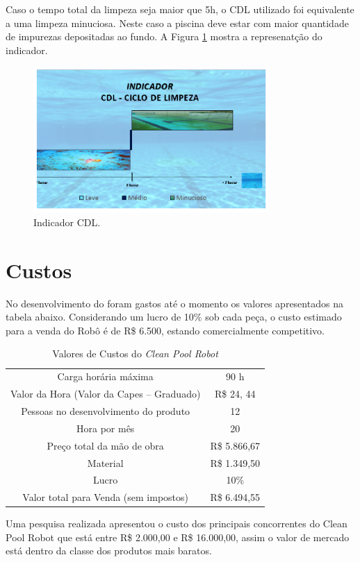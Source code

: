 Caso o tempo total da limpeza seja maior que 5h, o \textsf{CDL} utilizado foi equivalente a uma limpeza minuciosa. Neste caso a piscina deve estar com maior quantidade de impurezas depositadas ao fundo. A Figura \ref{fig:indicator} mostra a represenatção do indicador.
\par
  \begin{figure}[h]
    \centering
    \includegraphics[width=0.8\textwidth]{figures/indicator.png}
    \caption{Indicador CDL.}
    \label{fig:indicator}
  \end{figure}
  \FloatBarrier
\par

\section{Custos}
No desenvolvimento do \cpr foram gastos até o momento os valores apresentados na tabela abaixo. Considerando um lucro de 10\% sob cada peça, o custo estimado para a venda do Robô é de R\$ 6.500, estando comercialmente competitivo.
\begin{table}[h]
\centering
\caption{Valores de Custos do \textit{Clean Pool Robot}}
\label{my-label}
\begin{tabular}{@{}cc@{}}
Carga horária máxima                      & 90 h         \\
Valor da Hora (Valor da Capes – Graduado) & R\$ 24, 44   \\
Pessoas no desenvolvimento do produto     & 12           \\
Hora por mês                              & 20           \\
Preço total da mão de obra                & R\$ 5.866,67 \\
Material                                  & R\$ 1.349,50 \\
Lucro                                     & 10\%         \\ \midrule
Valor total para Venda (sem impostos)     & R\$ 6.494,55
\end{tabular}
\end{table}

Uma pesquisa realizada apresentou o custo dos principais concorrentes do Clean Pool Robot que está entre R\$ 2.000,00 e R\$ 16.000,00, assim o valor de mercado está dentro da classe dos produtos mais baratos.
